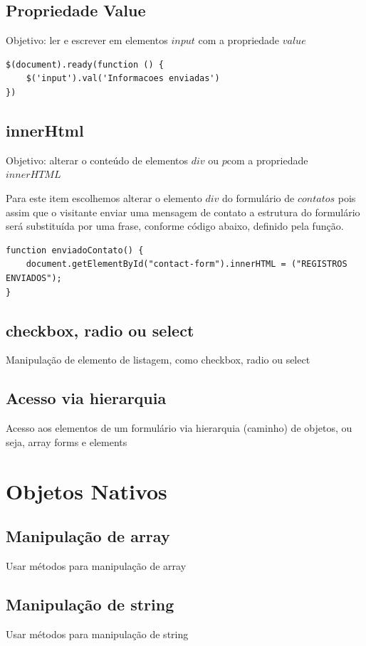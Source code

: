 \subsection{Propriedade Value}
	Objetivo: ler e escrever em elementos $input$ com a propriedade $value$
	
\begin{lstlisting}
$(document).ready(function () {
    $('input').val('Informacoes enviadas')
})
\end{lstlisting}


\subsection{innerHtml}
	Objetivo: alterar o conteúdo de elementos $div$ ou $p$com a propriedade $innerHTML$
	
	Para este item escolhemos alterar o elemento $div$ do formulário de $contatos$ pois assim que o visitante enviar uma mensagem de contato a estrutura do formulário será substituída por uma frase, conforme código abaixo, definido pela função.

\begin{lstlisting}
function enviadoContato() {
    document.getElementById("contact-form").innerHTML = ("REGISTROS ENVIADOS");
}
\end{lstlisting}


\subsection{checkbox, radio ou select}
Manipulação de elemento de listagem, como checkbox, radio ou select


\subsection{Acesso via hierarquia}
Acesso aos elementos de um formulário via hierarquia (caminho) de objetos, ou seja, array forms e elements



\section{Objetos Nativos }
\subsection{Manipulação de array}
Usar métodos para manipulação de array
\subsection{Manipulação de string}
Usar métodos para manipulação de string

